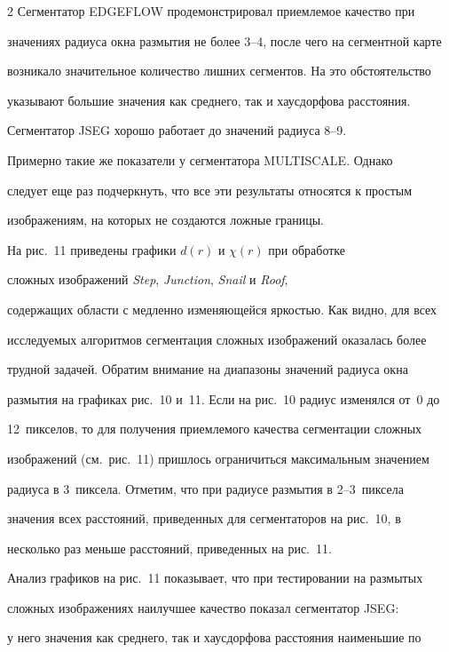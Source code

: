 \begin{multicols}{2}
Сегментатор {EDGEFLOW} продемонстрировал приемлемое качество при 


значениях радиуса окна размытия не более 3--4, после чего на сегментной карте 


возникало значительное количество лишних сегментов. На это обстоятельство 


указывают большие значения как среднего, так и хаусдорфова расстояния. 


Сегментатор {JSEG} хорошо работает до значений радиуса 8--9. 


Примерно такие же показатели у сегментатора {MULTISCALE}. Однако 


следует еще раз подчеркнуть, что все эти результаты относятся к простым 


изображениям, на которых не создаются ложные границы.


  


  На рис.~11 приведены графики $d(r)$ и $\chi(r)$ при обработке 


сложных изображений \textit{Step}, \textit{Junction}, \textit{Snail} и \textit{Roof}, 


содержащих области с медленно изменяющейся яркостью. Как видно, для всех 


исследуемых алгоритмов сегментация сложных изоб\-ра\-же\-ний оказалась более 


трудной задачей. Обратим внимание на диапазоны значений радиуса окна 


размытия на графиках рис.~10 и~11. Если на рис.~10 радиус изменялся от~0 до 


12~пикселов, то для получения приемлемого качества сегментации сложных 


изображений (см.\ рис.~11) пришлось ограничиться максимальным значением 


радиуса в 3~пиксела. Отметим, что при радиусе размытия в 2--3~пиксела 


значения всех расстояний, приведенных для сегментаторов на рис.~10, в 


несколько раз меньше расстояний, приведенных на рис.~11.


 


  Анализ графиков на рис.~11 показывает, что при тестировании на размытых 


сложных изображениях наилучшее качество показал сегментатор {JSEG}: 


у него значения как среднего, так и хаусдорфова расстояния наименьшие по 



\end{multicols}
